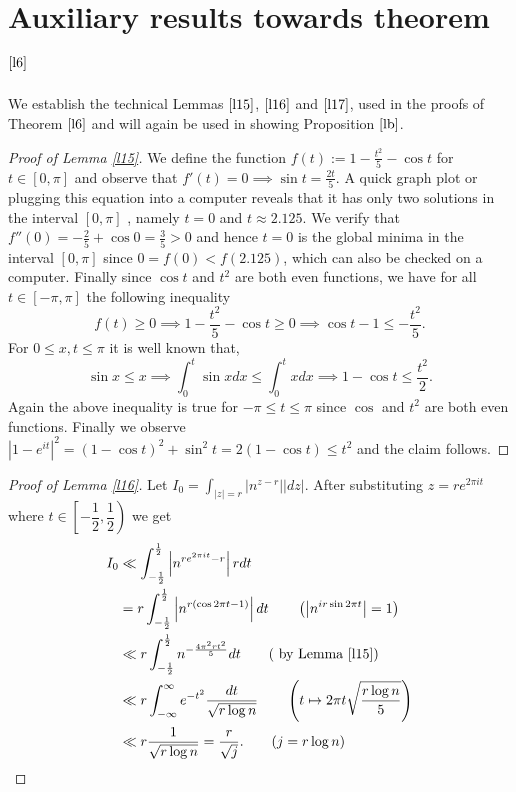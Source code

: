 \documentclass[12pt]{amsart}
\numberwithin{equation}{section}
\theoremstyle{remark}
\theoremstyle{remark}
\theoremstyle{definition}
\begin{document}
\section{Auxiliary results towards theorem $\ref{l6}$}\label{le}
We establish the technical Lemmas $\ref{l15}$, $\ref{l16}$ and $\ref{l17}$, used in the proofs of Theorem $\ref{l6}$ and will again be used in showing Proposition $\ref{lb}$.
\lll*
\begin{proof}[Proof of Lemma \ref{l15}]
\label{Proof of Lemma 3.1}
 We define the function $f(t):=1-\frac{t^2}{5}-\cos t$ for $t\in[0,\pi]$ and observe that $f'(t)=0\implies \sin t=\frac{2t}{5}$. A quick graph plot or plugging this equation into a computer reveals that it has only two solutions in the interval $[0,\pi]$ , namely $t=0$ and $t\approx 2.125$. We verify that $f'' (0)=-\frac{2}{5}+\cos 0=\frac{3}{5}>0$ and hence $t=0$ is the global minima in the interval $[0,\pi]$ since $0=f(0)< f(2.125)$, which can also be checked on a computer. Finally since $\cos t$ and $t^2$ are both even functions, we have for all $t\in[-\pi,\pi]$ the following inequality
$$f(t)\geqslant 0 \implies 1-\dfrac{t^2}{5}-\cos t\geqslant 0 \implies \cos t -1\leqslant -\dfrac{t^2}{5}.$$For $0\leqslant x,t\leqslant \pi$ it is well known that, 
$$\sin x\leqslant x\implies \displaystyle\int_{0}^{t} \sin x dx \leqslant \displaystyle\int_{0}^{t}x dx  \implies 1-\cos t\leqslant \dfrac{t^2}{2}.$$
Again the above inequality is true for $-\pi\leqslant t\leqslant \pi$ since $\cos$ and $t^2$ are both even functions. Finally we observe $\left|1-e^{it}\right|^2=(1-\cos t)^2+\sin^2t=2(1-\cos t)\leqslant t^2$ and the claim follows.
\end{proof}
\p*
\begin{proof}[Proof of Lemma \ref{l16}]
Let $I_0=\displaystyle\int_{|z|=r}\left|n^{z-r} \right| |dz|$. After substituting $z=re^{2\pi i t}$ where $t\in \left[-\dfrac{1}{2},\dfrac{1}{2} \right)$ we get
\begin{align}
\nonumber
I_0 &\ll \displaystyle\int_{-\frac{1}{2}}^{\frac{1}{2}}\left|n^{re^{2\pi i t}-r} \right| rdt\\
\nonumber
&= r\displaystyle\int_{-\frac{1}{2}}^{\frac{1}{2}}\left|n^{r(\cos 2\pi t -1)} \right|dt \qquad \left(\left| n^{i r \sin 2\pi t}\right|=1\right)\\
\nonumber
&\ll r\displaystyle\int_{-\frac{1}{2}}^{\frac{1}{2}}n^{-\frac{4\pi^2rt^2}{5}} dt \qquad (\text{ by Lemma } \ref{l15})\\
\nonumber
&\ll r\displaystyle\int_{-\infty}^{\infty}e^{-t^2} \dfrac{dt}{\sqrt{r\log n}}\qquad \left( t\mapsto 2\pi t\sqrt{\dfrac{r\log n}{{5}}} \right)\\
\nonumber
&\ll r\dfrac{1}{\sqrt{r\log n}}=\dfrac{r}{\sqrt{j}}.\qquad (j=r\log n)
\end{align}
\end{proof}
\end{document}
